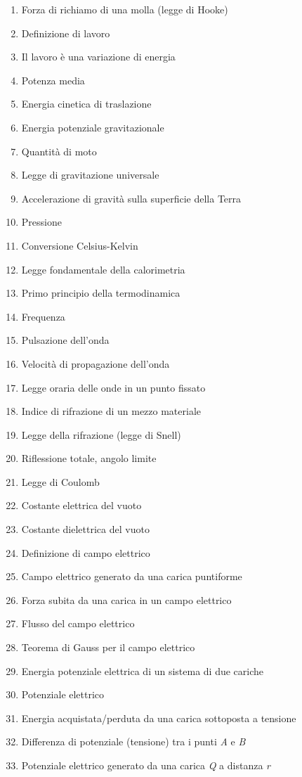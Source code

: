 \documentclass[a4paper,11pt,italian]{article}
\begin{document}
\begin{enumerate}
\item Forza di richiamo di una molla (legge di Hooke)
\item Definizione di lavoro
\item Il lavoro è una variazione di energia
\item Potenza media
\item Energia cinetica di traslazione
\item Energia potenziale gravitazionale
\item Quantità di moto
\item Legge di gravitazione universale
\item Accelerazione di gravità sulla superficie della Terra 
\item Pressione 
\item Conversione Celsius-Kelvin
\item Legge fondamentale della calorimetria
\item Primo principio della termodinamica
\item Frequenza 
\item Pulsazione dell'onda
\item Velocità di propagazione dell'onda
\item Legge oraria delle onde in un punto fissato 
\item Indice di rifrazione di un mezzo materiale
\item Legge della rifrazione (legge di Snell)
\item Riflessione totale, angolo limite
\item Legge di Coulomb
\item Costante elettrica del vuoto 
\item Costante dielettrica del vuoto
\item Definizione di campo elettrico
\item Campo elettrico generato da una carica puntiforme
\item Forza subita da una carica in un campo elettrico
\item Flusso del campo elettrico
\item Teorema di Gauss per il campo elettrico
\item Energia potenziale elettrica di un sistema di due cariche
\item Potenziale elettrico
\item Energia acquistata/perduta da una carica sottoposta a tensione
\item Differenza di potenziale (tensione) tra i punti \textit{A} e \textit{B}
\item Potenziale elettrico generato da una carica \textit{Q} a distanza \textit{r}

\end{enumerate}
\end{document}
